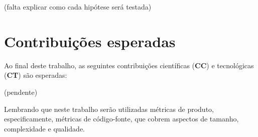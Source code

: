 (falta explicar como cada hipótese será testada)

%
%


\section{Contribuições esperadas}

Ao final deste trabalho, as seguintes contribuições científicas ({\bf CC}) e
tecnológicas ({\bf CT}) são esperadas:

(pendente)


Lembrando que neste trabalho serão utilizadas métricas de produto,
especificamente, métricas de código-fonte, que cobrem aspectos de tamanho,
complexidade e qualidade.

